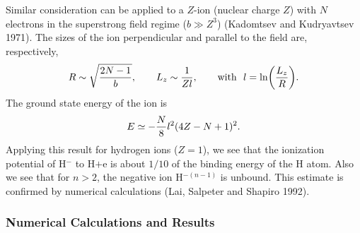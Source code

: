 Similar consideration can be applied to a $Z$-ion (nuclear charge
$Z$) with $N$ electrons in the superstrong field regime ($b\gg Z^3$)
(Kadomtsev and Kudryavtsev 1971).
The sizes of the ion perpendicular and parallel to the field are,
respectively,
\begin{equation}
R\sim \sqrt{2 N-1 \over b},\qquad L_z \sim {1 \over Z l},\qquad
{\rm with}~~l = \ln \biggl ({L_z \over R} \biggr).
\end{equation}
The ground state energy of the ion is
\begin{equation}
E \simeq -{N \over 8} l^2 (4 Z-N+1)^2.
\end{equation}
Applying this result for hydrogen ions ($Z=1$), we see that the ionization
potential of H$^{-}$ to H$+$e is about $1/10$ of the binding energy of the 
H atom. Also we see that for $n > 2$, the negative ion
H$^{-(n-1)}$ is unbound. This estimate is confirmed by numerical calculations
(Lai, Salpeter and Shapiro 1992). 

\subsubsection{Numerical Calculations and Results} 

